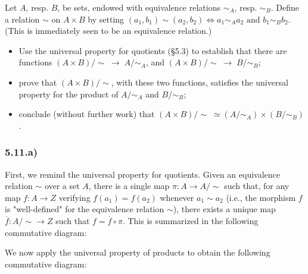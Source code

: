 \documentclass[12pt, letterpaper, twoside]{report}
\begin{document}
Let $A$, resp. $B$, be sets, endowed with equivalence relations $\sim_A$, resp. $\sim_B$. Define a relation $\sim$ on $A \times B$ by setting $(a_1, b_1) \sim (a_2, b_2) \Leftrightarrow a_1 \sim_A a_2 \text{ and } b_1 \sim_B b_2.$ (This is immediately seen to be an equivalence relation.)
\begin{itemize}
	\item Use the universal property for quotients (§5.3) to establish that there are functions $(A \times B)/\sim \; \to \; A/\sim_A$, and $(A \times B)/\sim \; \to \; B/\sim_B$;
	\item prove that $(A \times B)/\sim$, with these two functions, satisfies the universal property for the product of $A/\sim_A$ and $B/\sim_B$;
	\item conclude (without further work) that $(A \times B)/ \sim \; \simeq (A / \sim_A) \times (B / \sim_B)$.
\end{itemize}

\subsubsection*{5.11.a)}

First, we remind the universal property for quotients. Given an equivalence relation $\sim$ over a set $A$, there is a single map $\pi : A \to A/\sim$ such that, for any map $f : A \to Z$ verifying $f(a_1) = f(a_2)$ whenever $a_1 \sim a_2$ (i.e., the morphism $f$ is "well-defined" for the equivalence relation $\sim$), there exists a unique map $\overline{f} : A/\sim \to Z$ such that $f = \overline{f} \circ \pi$. This is summarized in the following commutative diagram:


We now apply the universal property of products to obtain the following commutative diagram:

\end{document}
